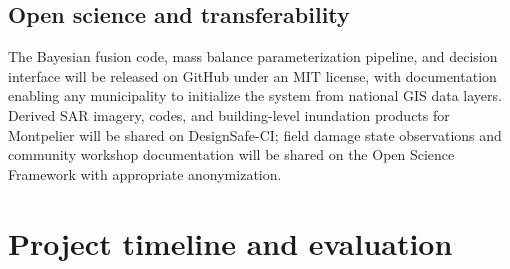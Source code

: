 \documentclass[11pt]{article}
\begin{document}
\vspace{-10pt}
\subsection{Open science and transferability}
The Bayesian fusion code, mass balance parameterization pipeline, and decision
interface will be released on GitHub under an MIT license, with documentation
enabling any municipality to initialize the system from national GIS data layers.
Derived SAR imagery, codes, and building-level inundation products for Montpelier will be shared on
DesignSafe-CI; field damage state observations and community workshop documentation
will be shared on the Open Science Framework with appropriate anonymization.


\section{Project timeline and evaluation}
\end{document}

